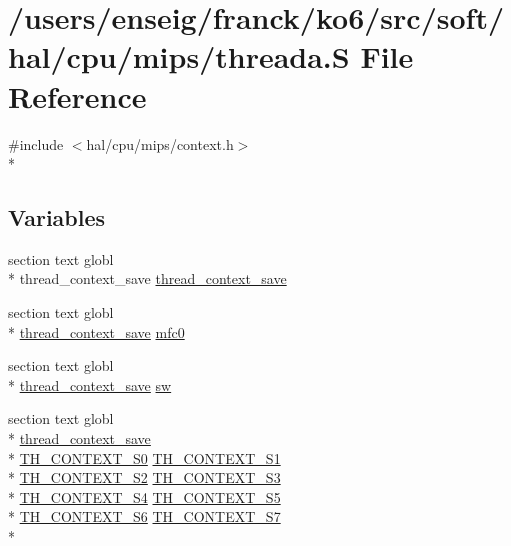 \hypertarget{mips_2threada_8S}{\section{/users/enseig/franck/ko6/src/soft/hal/cpu/mips/threada.S File Reference}
\label{mips_2threada_8S}
}
{\ttfamily \#include $<$hal/cpu/mips/context.\-h$>$}\\*
\subsection*{Variables}
\begin{DoxyCompactItemize}
\item 
section text globl \\*
thread\-\_\-context\-\_\-save \hyperlink{mips_2threada_8S_a89372006bcc54436099a65419c7895d7}{thread\-\_\-context\-\_\-save}
\item 
section text globl \\*
\hyperlink{thread_8h_a4ec481f4858f7894f48f951d1a59e868}{thread\-\_\-context\-\_\-save} \hyperlink{mips_2threada_8S_a16d060c3cb1010ca7012096ec19ff51d}{mfc0}
\item 
section text globl \\*
\hyperlink{thread_8h_a4ec481f4858f7894f48f951d1a59e868}{thread\-\_\-context\-\_\-save} \hyperlink{mips_2threada_8S_a0616a0b0d185f884abf396081cef7c0d}{sw}
\item 
section text globl \\*
\hyperlink{thread_8h_a4ec481f4858f7894f48f951d1a59e868}{thread\-\_\-context\-\_\-save} \\*
\hyperlink{riscv_2context_8h_a820f77abfecbcda42a4a08f9993ecafc}{T\-H\-\_\-\-C\-O\-N\-T\-E\-X\-T\-\_\-\-S0} \hyperlink{riscv_2context_8h_aab72df921d27ad69e4e9df4bf0efb042}{T\-H\-\_\-\-C\-O\-N\-T\-E\-X\-T\-\_\-\-S1} \\*
\hyperlink{riscv_2context_8h_a52ac0be2164f540dd56ac12388283661}{T\-H\-\_\-\-C\-O\-N\-T\-E\-X\-T\-\_\-\-S2} \hyperlink{riscv_2context_8h_a8a948b9113ade3033fde285ea404e1e9}{T\-H\-\_\-\-C\-O\-N\-T\-E\-X\-T\-\_\-\-S3} \\*
\hyperlink{riscv_2context_8h_aaf2ea484ecf69190e4b879df822d8629}{T\-H\-\_\-\-C\-O\-N\-T\-E\-X\-T\-\_\-\-S4} \hyperlink{riscv_2context_8h_aa56db0257d8a0222c3a39b75d1c80df6}{T\-H\-\_\-\-C\-O\-N\-T\-E\-X\-T\-\_\-\-S5} \\*
\hyperlink{riscv_2context_8h_a83855a56a2f7ab8f6e44be01fd7b0403}{T\-H\-\_\-\-C\-O\-N\-T\-E\-X\-T\-\_\-\-S6} \hyperlink{riscv_2context_8h_a68d16accd8896a4e1bd7fe8853eda411}{T\-H\-\_\-\-C\-O\-N\-T\-E\-X\-T\-\_\-\-S7} \\*

\end{DoxyCompactItemize}
